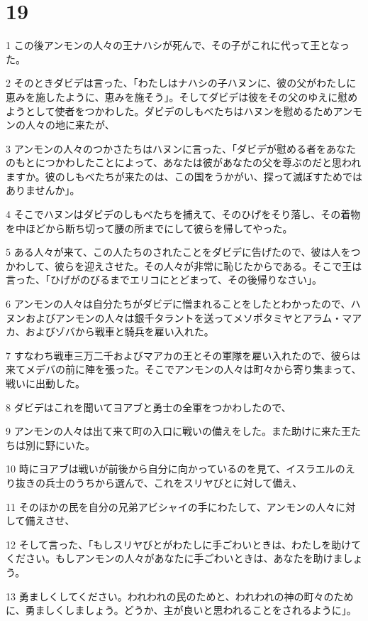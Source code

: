 \chapter{19}

\par 1 この後アンモンの人々の王ナハシが死んで、その子がこれに代って王となった。
\par 2 そのときダビデは言った、「わたしはナハシの子ハヌンに、彼の父がわたしに恵みを施したように、恵みを施そう」。そしてダビデは彼をその父のゆえに慰めようとして使者をつかわした。ダビデのしもべたちはハヌンを慰めるためアンモンの人々の地に来たが、
\par 3 アンモンの人々のつかさたちはハヌンに言った、「ダビデが慰める者をあなたのもとにつかわしたことによって、あなたは彼があなたの父を尊ぶのだと思われますか。彼のしもべたちが来たのは、この国をうかがい、探って滅ぼすためではありませんか」。
\par 4 そこでハヌンはダビデのしもべたちを捕えて、そのひげをそり落し、その着物を中ほどから断ち切って腰の所までにして彼らを帰してやった。
\par 5 ある人々が来て、この人たちのされたことをダビデに告げたので、彼は人をつかわして、彼らを迎えさせた。その人々が非常に恥じたからである。そこで王は言った、「ひげがのびるまでエリコにとどまって、その後帰りなさい」。
\par 6 アンモンの人々は自分たちがダビデに憎まれることをしたとわかったので、ハヌンおよびアンモンの人々は銀千タラントを送ってメソポタミヤとアラム・マアカ、およびゾバから戦車と騎兵を雇い入れた。
\par 7 すなわち戦車三万二千およびマアカの王とその軍隊を雇い入れたので、彼らは来てメデバの前に陣を張った。そこでアンモンの人々は町々から寄り集まって、戦いに出動した。
\par 8 ダビデはこれを聞いてヨアブと勇士の全軍をつかわしたので、
\par 9 アンモンの人々は出て来て町の入口に戦いの備えをした。また助けに来た王たちは別に野にいた。
\par 10 時にヨアブは戦いが前後から自分に向かっているのを見て、イスラエルのえり抜きの兵士のうちから選んで、これをスリヤびとに対して備え、
\par 11 そのほかの民を自分の兄弟アビシャイの手にわたして、アンモンの人々に対して備えさせ、
\par 12 そして言った、「もしスリヤびとがわたしに手ごわいときは、わたしを助けてください。もしアンモンの人々があなたに手ごわいときは、あなたを助けましょう。
\par 13 勇ましくしてください。われわれの民のためと、われわれの神の町々のために、勇ましくしましょう。どうか、主が良いと思われることをされるように」。

